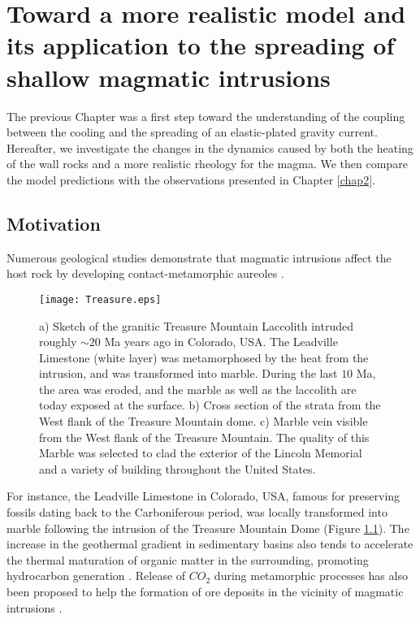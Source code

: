 \chapter[Toward a more realistic model]{Toward a more realistic model and its application to the
  spreading of shallow magmatic intrusions}
\label{Heating}

\minitoc

The previous Chapter was a first  step toward the understanding of the
coupling between  the cooling and  the spreading of  an elastic-plated
gravity  current.   Hereafter,  we  investigate  the  changes  in  the
dynamics  caused by  both the  heating of  the wall  rocks and  a more
realistic  rheology  for  the  magma.    We  then  compare  the  model
predictions with the observations presented in Chapter \ref{chap2}.


\section{Motivation}
\label{sec:introduction}

Numerous  geological  studies  demonstrate  that  magmatic  intrusions
affect  the  host  rock  by  developing  contact-metamorphic  aureoles
\citep{Jaeger:1959du,Galushkin:1997dy,Senger:2014tt}.  
\begin{figure}[h!]
  \begin{center}
    \graphicspath{ {/Users/thorey/Documents/These/Manuscript/Figure/Chapter4/} }
    \texttt{[image: Treasure.eps]}
    \caption{a)  Sketch of  the granitic  Treasure Mountain  Laccolith
      intruded roughly  $\sim 20$ Ma  years ago in Colorado,  USA. The
      Leadville Limestone (white layer)  was metamorphosed by the heat
      from the intrusion, and was transformed into marble.  During the
      last $10$ Ma, the area was eroded, and the marble as well as the
      laccolith are today exposed at the surface.  b) Cross section of
      the strata from the West flank of the Treasure Mountain dome. c)
      Marble  vein  visible  from  the  West  flank  of  the  Treasure
      Mountain. The  quality of this  Marble was selected to  clad the
      exterior  of the  Lincoln  Memorial and  a  variety of  building
      throughout the United States.}
    \label{Treasure}
  \end{center}
\end{figure}
 For  instance,
the  Leadville  Limestone  in  Colorado, USA,  famous  for  preserving
fossils  dating   back  to  the  Carboniferous   period,  was  locally
transformed  into  marble  following  the intrusion  of  the  Treasure
Mountain Dome (Figure \ref{Treasure}).  The increase in the geothermal
gradient in  sedimentary basins also  tends to accelerate  the thermal
maturation of organic matter in the surrounding, promoting hydrocarbon
generation   \citep{Senger:2014tt}.    Release    of   $CO_2$   during
metamorphic processes has also been  proposed to help the formation of
ore    deposits   in    the    vicinity    of   magmatic    intrusions
\citep{SILLITOE:1998bs,Ganino:2008ft,Zhou:2008hc}.


